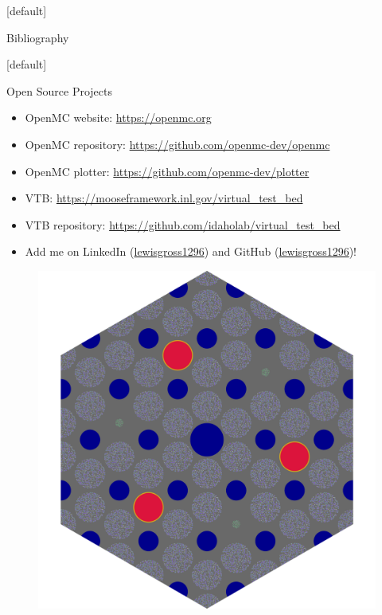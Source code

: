 \documentclass[9pt,t,aspectratio=169]{beamer}
\makeatletter
\newenvironment{withoutheadline}{
       \setbeamertemplate{headline}[default]
       \def\beamer@entrycode{\vspace*{-\headheight}}
    }{}
\makeatother
\begin{document}
\begin{withoutheadline}
    \begin{frame}[allowframebreaks]{Bibliography}
        \printbibliography
    \end{frame}
\end{withoutheadline}

\begin{withoutheadline}
    \begin{frame}{Open Source Projects}
        \begin{minipage}[t]{0.43\linewidth}
            \begin{itemize}
                \item OpenMC website: \href{https://openmc.org}{https://openmc.org}
                \item OpenMC repository: \href{https://github.com/openmc-dev/openmc}{https://github.com/openmc-dev/openmc}
                \item OpenMC plotter: \href{https://github.com/openmc-dev/plotter}{https://github.com/openmc-dev/plotter}
                \item VTB: \href{https://mooseframework.inl.gov/virtual_test_bed}{https://mooseframework.inl.gov/virtual\_test\_bed}
                \item VTB repository: \href{https://github.com/idaholab/virtual_test_bed}{https://github.com/idaholab/virtual\_test\_bed}
                \item Add me on LinkedIn (\href{https://www.linkedin.com/in/lewisgross1296}{lewisgross1296}) and GitHub (\href{https://github.com/lewisgross1296}{lewisgross1296})!
            \end{itemize}
        \end{minipage}
        \hfill%
        \begin{minipage}[t]{0.54\linewidth}
            \begin{figure}
                \includegraphics[width=0.9\linewidth]{figures/gcmr_slice.png}

\end{figure}
\end{minipage}
\end{frame}
\end{withoutheadline}
\end{document}

